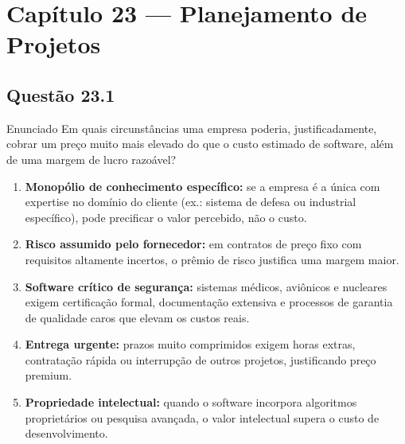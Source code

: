 \documentclass[12pt,a4paper]{article}
\begin{document}
\section*{Capítulo 23 — Planejamento de Projetos}

\subsection*{Questão 23.1}
\begin{questao}{Enunciado}
Em quais circunstâncias uma empresa poderia, justificadamente, cobrar um
preço muito mais elevado do que o custo estimado de software, além de uma
margem de lucro razoável?
\end{questao}
\begin{resposta}
\begin{enumerate}[nosep]
  \item \textbf{Monopólio de conhecimento específico:} se a empresa é a única
        com expertise no domínio do cliente (ex.: sistema de defesa ou
        industrial específico), pode precificar o valor percebido, não o custo.
  \item \textbf{Risco assumido pelo fornecedor:} em contratos de preço fixo
        com requisitos altamente incertos, o prêmio de risco justifica uma
        margem maior.
  \item \textbf{Software crítico de segurança:} sistemas médicos, aviônicos
        e nucleares exigem certificação formal, documentação extensiva e
        processos de garantia de qualidade caros que elevam os custos reais.
  \item \textbf{Entrega urgente:} prazos muito comprimidos exigem horas extras,
        contratação rápida ou interrupção de outros projetos, justificando
        preço premium.
  \item \textbf{Propriedade intelectual:} quando o software incorpora
        algoritmos proprietários ou pesquisa avançada, o valor intelectual
        supera o custo de desenvolvimento.
\end{enumerate}
\end{resposta}

\end{document}
